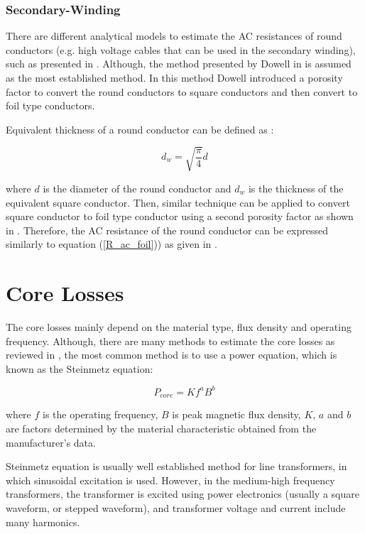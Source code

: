 \documentclass[a4paper, 11pt]{article} %
\begin{document}
\subsubsection{Secondary-Winding}

There are different analytical models to estimate the AC resistances of round conductors (e.g. high voltage cables that can be used in the secondary winding), such as presented in \cite{Sullivan2003,Ferreira1994}. Although, the method presented by Dowell in \cite{Dowell1966} is assumed as the most established method. In this method Dowell introduced a porosity factor to convert the round conductors to square conductors and then convert to foil type conductors.

Equivalent thickness of a round conductor can be defined as \cite{Dowell1966}:

\begin{equation}
 d_w =  \sqrt{\frac{\pi}{4}} d 
\end{equation}

where $d$ is the diameter of the round conductor and $d_w$ is the thickness of the equivalent square conductor. Then, similar technique can be applied to convert square conductor to foil type conductor using a second porosity factor as shown in \cite{Villar2010}. Therefore, the AC resistance of the round conductor can be expressed similarly to equation (\ref{R_ac_foil})) as given in \cite{Villar2010}.


\section{Core Losses}

The core losses mainly depend on the material type, flux density and operating frequency. Although, there are many methods to estimate the core losses as reviewed in \cite{Shen2006}, the most common method is to use a power equation, which is known as the Steinmetz equation:

\begin{equation}
 P_{core} = K f^a B^b
\end{equation}

where $f$ is the operating frequency, $B$ is peak magnetic flux density, $K$, $a$ and $b$ are factors determined by the material characteristic obtained from the manufacturer's data.

Steinmetz equation is usually well established method for line transformers, in which sinusoidal excitation is used. However, in the medium-high frequency transformers, the transformer is excited using power electronics (usually a square waveform, or stepped waveform), and transformer voltage and current include many harmonics.
\end{document}
